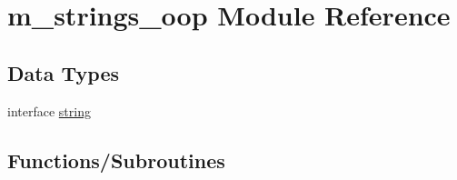 \hypertarget{namespacem__strings__oop}{}\section{m\+\_\+strings\+\_\+oop Module Reference}
\label{namespacem__strings__oop}
\subsection*{Data Types}
\begin{DoxyCompactItemize}
\item 
interface \mbox{\hyperlink{structm__strings__oop_1_1string}{string}}
\end{DoxyCompactItemize}
\subsection*{Functions/\+Subroutines}
